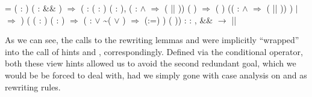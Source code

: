 \coqdoceol
\coqdocemptyline
\coqdocnoindent
{} = \coqdoceol
\coqdocnoindent
{} (  : ) ( :  \&\& ) \ensuremath{\Rightarrow}\coqdoceol
\coqdocnoindent
(  : \coqdockw{\ensuremath{\forall}} ( : ) ( : ),\coqdoceol
\coqdocindent{8.00em}
( \coqdocvar{\_} :  \ensuremath{\land}  \ensuremath{\Rightarrow}  ( || )) (  ) \ensuremath{\Rightarrow}\coqdoceol
\coqdocindent{0.50em}
\coqdoceol
\coqdocindent{1.50em}
 (  )     (( \coqdocvar{\_} :  \ensuremath{\land}  \ensuremath{\Rightarrow}  ( || )) )\coqdoceol
\coqdocindent{0.50em}
\coqdoceol
\coqdocindent{0.50em}
\ensuremath{|}    \ensuremath{\Rightarrow}   \coqdoceol
\coqdocindent{0.50em}
)\coqdoceol
\coqdocindent{1.00em}
( ( : ) (\coqdocvar{\_} : ) \ensuremath{\Rightarrow}\coqdoceol
\coqdocindent{1.50em}
(  :     \ensuremath{\lor}   \textasciitilde ( \ensuremath{\lor} ) \ensuremath{\Rightarrow}\coqdoceol
\coqdocindent{2.00em}
 (:=)  ) ( ))\coqdoceol
\coqdocindent{2.50em}
: \coqdockw{\ensuremath{\forall}}   : ,  \&\&  \ensuremath{\rightarrow}  || 

\coqdocemptyline


As we can see, the calls to the rewriting lemmas  and  were
implicitly ``wrapped'' into the call of hints  and ,
correspondingly. Defined via the conditional operator, both these view
hints allowed us to avoid the second redundant goal, which we would be
be forced to deal with, had we simply gone with case analysis on
 and  as rewriting rules.


